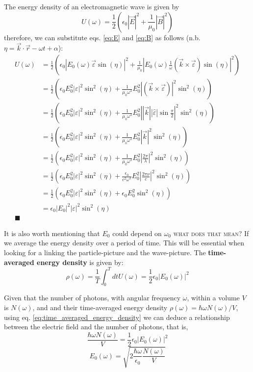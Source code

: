 \documentclass{article}
\let\originalleft\left
\let\originalright\right
\renewcommand{\l}{\originalleft}
\renewcommand{\r}{\originalright}
\renewcommand{\v}[1]{\vec{#1}}
\newcommand{\textq}[1]{{\color{light083676}\textsc{#1}}}
\begin{document}
The energy density of an electromagnetic wave is given by 
\begin{equation}
    \label{eq:energy_density_em}
    U(\omega) = \frac{1}{2} \l( \epsilon_0 |\Vec{E}|^2 + \frac{1}{\mu_0} |\Vec{B}|^2 \r)
\end{equation}
therefore, we can substitute eqs. \ref{eq:E} and \ref{eq:B} as follows (n.b. $\eta=\Vec{k}\cdot\Vec{r} - \omega t + \alpha$):
\begin{align*}
    U(\omega) &= \frac{1}{2} \l( \epsilon_0 \l| E_0(\omega) \Vec{\varepsilon}\sin(\eta) \r|^2  + \frac{1}{\mu_0} \l| E_0(\omega) \frac{1}{\omega} (\v{k} \times \v{\varepsilon}) \sin(\eta) \r|^2\r) \\ 
    &= \frac{1}{2} \l( \epsilon_0 E_0^2|\varepsilon|^2 \sin^2(\eta) + \frac{1}{\mu_0\omega^2}E_0^2 |(\v{k} \times \v{\varepsilon})|^2 \sin^2(\eta)  \r) \\
    &= \frac{1}{2} \l(  \epsilon_0 E_0^2|\varepsilon|^2 \sin^2(\eta) + \frac{1}{\mu_0\omega^2}E_0^2 \l| |\v{k}||\hat{\varepsilon}| \sin \frac{\pi}{2} \r|^2 \sin^2(\eta)  \r) \\
    &= \frac{1}{2} \l(  \epsilon_0 E_0^2|\varepsilon|^2 \sin^2(\eta) + \frac{1}{\mu_0\omega^2}E_0^2 \l| \v{k} \r|^2 \sin^2(\eta)  \r) \\
    &= \frac{1}{2} \l(  \epsilon_0 E_0^2|\varepsilon|^2 \sin^2(\eta) + \frac{1}{\mu_0\omega^2}E_0^2 \l| \frac{2\pi}{\lambda} \r|^2 \sin^2(\eta)  \r) \\
    &= \frac{1}{2} \l(  \epsilon_0 E_0^2|\varepsilon|^2 \sin^2(\eta) + \frac{\epsilon_0}{
c^2\omega^2}E_0^2 \l| \frac{2\pi \nu}{c} \r|^2 \sin^2(\eta)  \r) \\
    &= \frac{1}{2} \l(  \epsilon_0 E_0^2|\varepsilon|^2 \sin^2(\eta) + \epsilon_0E_0^2 \sin^2(\eta)  \r) \\
    &=  \epsilon_0 |E_0|^2|\varepsilon|^2 \sin^2(\eta)  \\
    \blacksquare
\end{align*}

It is also worth mentioning that $E_0$ could depend on $\omega_0$ \textq{what does that mean?} If we average the energy density over a period of time. This will be essential when looking for a linking the particle-picture and the wave-picture. The \textbf{time-averaged energy density} is given by:
\begin{equation}
    \label{eq:time_averaged_energy_density}
    \rho (\omega) = \frac{1}{T} \int_0^T dt U(\omega) = \frac{1}{2}\epsilon_0 |E_0(\omega)|^2
\end{equation}

Given that the number of photons, with angular frequency $\omega$, within a volume $V$ is $N(\omega)$, and and their time-averaged energy density $\rho(\omega) = \hbar \omega N(\omega) / V$, using eq. \ref{eq:time_averaged_energy_density} we can deduce a relationship between the electric field and the number of photons, that is,
\begin{equation*}
    \frac{\hbar \omega N(\omega)}{V}    =   \frac{1}{2}\epsilon_0 |E_0(\omega)|^2
\end{equation*}
\begin{equation}
    \label{eq:enectric_field_num_photons}
    E_0(\omega) = \sqrt{2 \frac{\hbar \omega}{\epsilon_0}\frac{N(\omega)}{V}}
\end{equation}
\end{document}
